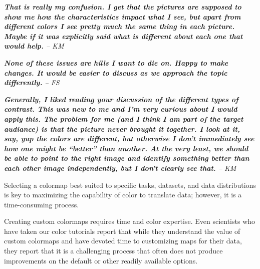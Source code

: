 \documentclass{IEEEcsmag}
\newcommand*{\km}[1]{\textcolor{km}{\emph{\textbf{#1} -- KM}}}
\newcommand*{\fs}[1]{\textcolor{fs}{\emph{\textbf{#1} -- FS}}}
\begin{document}
\km{That is really my confusion. I get that the pictures are supposed to show me how the characteristics impact what I see, but apart from different colors I see pretty much the same thing in each picture. Maybe if it was explicitly said what is different about each one that would help.}

\fs{None of these issues are hills I want to die on. Happy to make changes. It would be easier to discuss as we approach the topic differently.}

\km{Generally, I liked reading your discussion of the different types of contrast. This was new to me and I'm very curious about I would apply this. The problem for me (and I think I am part of the target audiance) is that the picture never brought it together. I look at it, say, yup the colors are different, but otherwise I don't immediately see how one might be ``better'' than another. At the very least, we should be able to point to the right image and identify something better than each other image independently, but I don't clearly see that.}


Selecting a colormap best suited to specific tasks, datasets, and data distributions is key to maximizing the capability of color to translate data; however, it is a time-consuming process.

Creating custom colormaps requires time and color expertise. Even scientists who have taken our color tutorials report that while they understand the value of custom colormaps and have devoted time to customizing maps for their data, they report that it is a challenging process that often does not produce improvements on the default or other readily available options.



\end{document}
